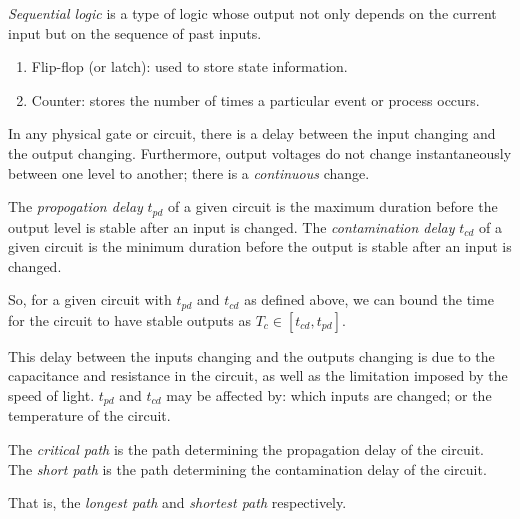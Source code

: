 \begin{definition}
	\emph{Sequential logic} is a type of logic whose output not only
	depends on the current input but on the sequence of past inputs.
\end{definition}

\begin{examples}
	\begin{enumerate}
		\item Flip-flop (or latch): used to store state information.
		\item Counter: stores the number of times a particular event
			or process occurs.
	\end{enumerate}
\end{examples}

In any physical gate or circuit, there is a delay between the input changing
and the output changing.
Furthermore, output voltages do not change instantaneously between one level
to another; there is a \emph{continuous} change.

\begin{definition}
	The \emph{propogation delay} $t_{pd}$ of a given circuit is the
	maximum duration before the output level is stable after an input is
	changed.
	The \emph{contamination delay} $t_{cd}$ of a given circuit is the
	minimum duration before the output is stable after an input is changed.
\end{definition}

So, for a given circuit with $t_{pd}$ and $t_{cd}$ as defined above, we can
bound the time for the circuit to have stable outputs as 
$T_c \in [t_{cd}, t_{pd}]$.

This delay between the inputs changing and the outputs changing is due to the
capacitance and resistance in the circuit, as well as the limitation imposed
by the speed of light.
$t_{pd}$ and $t_{cd}$ may be affected by: which inputs are changed; or 
the temperature of the circuit.

\begin{definition}
	The \emph{critical path} is the path determining the propagation delay 
	of the circuit.
	The \emph{short path} is the path determining the contamination delay of
	the circuit.
\end{definition}

That is, the \emph{longest path} and \emph{shortest path} respectively.


